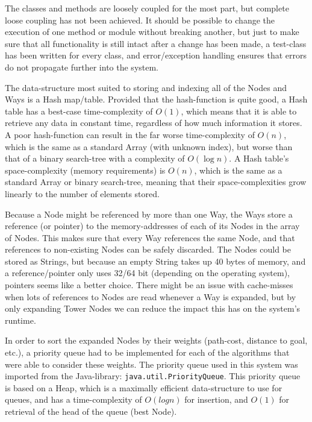 The classes and methods are loosely coupled for the most part, but complete loose coupling has not been achieved. It should be possible to change the execution of one method or module without breaking another, but just to make sure that all functionality is still intact after a change has been made, a test-class has been written for every class, and error/exception handling ensures that errors do not propagate further into the system.

The data-structure most suited to storing and indexing all of the Nodes and Ways is a Hash map/table. Provided that the hash-function is quite good, a Hash table has a best-case time-complexity of $O(1)$, which means that it is able to retrieve any data in constant time, regardless of how much information it stores. A poor hash-function can result in the far worse time-complexity of $O(n)$, which is the same as a standard Array (with unknown index), but worse than that of a binary search-tree with a complexity of $O(\log n)$. A Hash table's space-complexity (memory requirements) is $O(n)$, which is the same as a standard Array or binary search-tree, meaning that their space-complexities grow linearly to the number of elements stored. \cite{BigOCheatSheet}

Because a Node might be referenced by more than one Way, the Ways store a reference (or pointer) to the memory-addresses of each of its Nodes in the array of Nodes. This makes sure that every Way references the same Node, and that references to non-existing Nodes can be safely discarded. The Nodes could be stored as Strings, but because an empty String takes up 40 bytes of memory, and a reference/pointer only uses 32/64 bit (depending on the operating system), pointers seems like a better choice. There might be an issue with cache-misses when lots of references to Nodes are read whenever a Way is expanded, but by only expanding Tower Nodes we can reduce the impact this has on the system's runtime.

In order to sort the expanded Nodes by their weights (path-cost, distance to goal, etc.), a priority queue had to be implemented for each of the algorithms that were able to consider these weights. The priority queue used in this system was imported from the Java-library: \verb|java.util.PriorityQueue|. This priority queue is based on a Heap, which is a maximally efficient data-structure to use for queues, and has a time-complexity of $O(log n)$ for insertion, and $O(1)$ for retrieval of the head of the queue (best Node).


